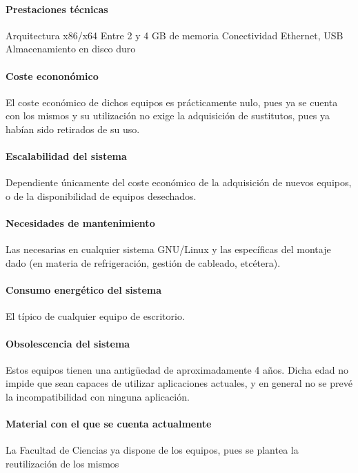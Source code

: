 \paragraph{Prestaciones técnicas}
Arquitectura x86/x64
Entre 2 y 4 GB de memoria
Conectividad Ethernet, USB
Almacenamiento en disco duro
\paragraph{Coste econonómico}

El coste económico de dichos equipos es prácticamente nulo, pues ya se cuenta con los mismos y su utilización no exige la adquisición de sustitutos, pues ya habían sido retirados de su uso.

\paragraph{Escalabilidad del sistema}

Dependiente únicamente del coste económico de la adquisición de nuevos equipos, o de la disponibilidad de equipos desechados.

\paragraph{Necesidades de mantenimiento}

Las necesarias en cualquier sistema GNU/Linux y las específicas del montaje dado (en materia de refrigeración, gestión de cableado, etcétera).

\paragraph{Consumo energético del sistema}

El típico de cualquier equipo de escritorio.

\paragraph{Obsolescencia del sistema}

Estos equipos tienen una antigüedad de aproximadamente 4 años. Dicha edad no impide que sean capaces de utilizar aplicaciones actuales, y en general no se prevé la incompatibilidad con ninguna aplicación.

\paragraph{Material con el que se cuenta actualmente}
La Facultad de Ciencias ya dispone de los equipos, pues se plantea la reutilización de los mismos

